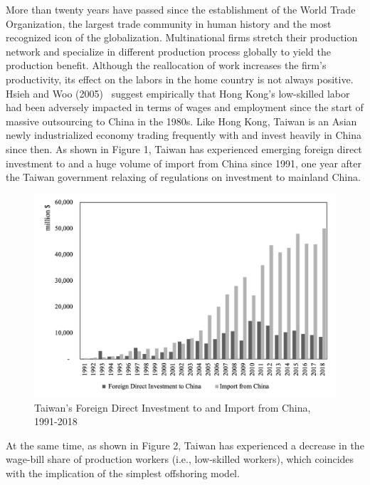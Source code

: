 \documentclass{article}
\begin{document}
More than twenty years have passed since the establishment of the World Trade Organization, the largest trade community in human history and the most recognized icon of the globalization. Multinational firms stretch their production network and specialize in different production process globally to yield the production benefit. Although the reallocation of work increases the firm’s productivity, its effect on the labors in the home country is not always positive. Hsieh and Woo (2005)~\cite{hsieh} suggest empirically that Hong Kong’s low-skilled labor had been adversely impacted in terms of wages and employment since the start of massive outsourcing to China in the 1980s. Like Hong Kong, Taiwan is an Asian newly industrialized economy trading frequently with and invest heavily in China since then. As shown in Figure 1, Taiwan has experienced emerging foreign direct investment to and a huge volume of import from China since 1991, one year after the Taiwan government relaxing of regulations on investment to mainland China.\par 
\begin{figure}
\centering
\includegraphics[width=1\textwidth]{figure1.png}
\caption{\label{fig:1}Taiwan's Foreign Direct Investment to and Import from China, 1991-2018}
\end{figure}
At the same time, as shown in Figure 2, Taiwan has experienced a decrease in the wage-bill share of production workers (i.e., low-skilled workers), which coincides with the implication of the simplest offshoring model. 
\end{document}
